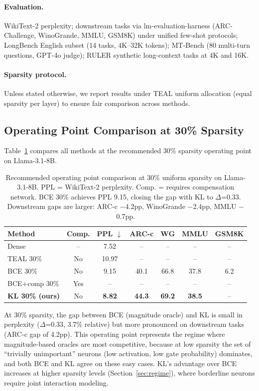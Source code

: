 \documentclass[11pt,a4paper]{article}
\begin{document}
\paragraph{Evaluation.} WikiText-2 perplexity; downstream tasks via lm-evaluation-harness (ARC-Challenge, WinoGrande, MMLU, GSM8K) under unified few-shot protocols; LongBench English subset (14 tasks, 4K--32K tokens); MT-Bench (80 multi-turn questions, GPT-4o judge); RULER synthetic long-context tasks at 4K and 16K.

\paragraph{Sparsity protocol.} Unless stated otherwise, we report results under TEAL uniform allocation (equal sparsity per layer) to ensure fair comparison across methods.

\subsection{Operating Point Comparison at 30\% Sparsity}
\label{sec:main-results}

Table~\ref{tab:operating-point} compares all methods at the recommended 30\% sparsity operating point on Llama-3.1-8B.

\begin{table}[h]
\centering
\small
\begin{tabular}{lcccccc}
\toprule
Method & Comp. & PPL $\downarrow$ & ARC-c & WG & MMLU & GSM8K \\
\midrule
Dense & -- & 7.52 & -- & -- & -- & -- \\
TEAL 30\% & No & 10.97 & -- & -- & -- & -- \\
BCE 30\% & No & 9.15 & 40.1 & 66.8 & 37.8 & 6.2 \\
BCE+comp 30\% & Yes & -- & -- & -- & -- & -- \\
\textbf{KL 30\% (ours)} & No & \textbf{8.82} & \textbf{44.3} & \textbf{69.2} & \textbf{38.5} & -- \\
\bottomrule
\end{tabular}
\caption{Recommended operating point comparison at 30\% uniform sparsity on Llama-3.1-8B. PPL = WikiText-2 perplexity. Comp. = requires compensation network. BCE 30\% achieves PPL 9.15, closing the gap with KL to $\Delta$=0.33. Downstream gaps are larger: ARC-c $-$4.2pp, WinoGrande $-$2.4pp, MMLU $-$0.7pp.}
\label{tab:operating-point}
\end{table}

At 30\% sparsity, the gap between BCE (magnitude oracle) and KL is small in perplexity ($\Delta$=0.33, 3.7\% relative) but more pronounced on downstream tasks (ARC-c gap of 4.2pp). This operating point represents the regime where magnitude-based oracles are most competitive, because at low sparsity the set of ``trivially unimportant'' neurons (low activation, low gate probability) dominates, and both BCE and KL agree on these easy cases. KL's advantage over BCE increases at higher sparsity levels (Section~\ref{sec:regime}), where borderline neurons require joint interaction modeling.
\end{document}
